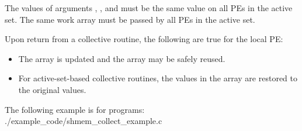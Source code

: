 \begin{apidefinition}
{\begin{DeprecateBlock}
    The values of arguments , , and 
    must be the same value on all \acp{PE} in the active set. The same
     work array must be passed by all \acp{PE} in the active set.

    Upon return from a collective routine, the following are true for the local
    \ac{PE}:
    \begin{itemize}
    \item The \dest{} array is updated and the \source{} array may be safely reused.
    \item For active-set-based collective routines, the values in the  array are
    restored to the original values.
    \end{itemize}
\end{DeprecateBlock}
}



\begin{apiexamples}

\apicexample
    {The following  example is for \CorCpp{} programs:}
    {./example_code/shmem_collect_example.c}
    {}

\end{apiexamples}

\end{apidefinition}
